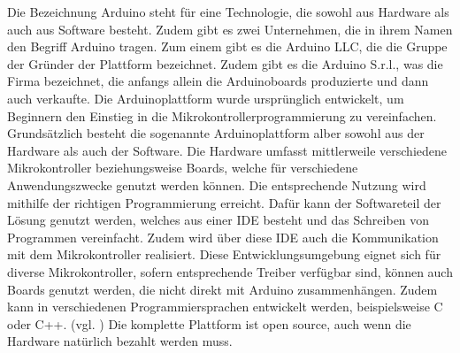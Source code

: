 Die Bezeichnung Arduino steht für eine Technologie, die sowohl aus Hardware als auch aus Software besteht. Zudem gibt es zwei Unternehmen, die in ihrem Namen den Begriff Arduino tragen. Zum einem gibt es die Arduino LLC, die die Gruppe der Gründer der Plattform bezeichnet. Zudem gibt es die Arduino S.r.l., was die Firma bezeichnet, die anfangs allein die Arduinoboards produzierte und dann auch verkaufte. Die Arduinoplattform wurde ursprünglich entwickelt, um Beginnern den Einstieg in die Mikrokontrollerprogrammierung zu vereinfachen. 
Grundsätzlich besteht die sogenannte Arduinoplattform alber sowohl aus der Hardware als auch der Software. Die Hardware umfasst mittlerweile verschiedene Mikrokontroller beziehungsweise Boards, welche für verschiedene Anwendungszwecke genutzt werden können. Die entsprechende Nutzung wird mithilfe der richtigen Programmierung erreicht. Dafür kann der Softwareteil der Lösung genutzt werden, welches aus einer \ac{IDE}  besteht und das Schreiben von Programmen vereinfacht. Zudem wird über diese \ac{IDE} auch die Kommunikation mit dem Mikrokontroller realisiert. Diese Entwicklungsumgebung eignet sich für diverse Mikrokontroller, sofern entsprechende Treiber verfügbar sind, können auch Boards genutzt werden, die nicht direkt mit Arduino zusammenhängen. Zudem kann in verschiedenen Programmiersprachen entwickelt werden, beispielsweise C oder C++. (vgl. \cite{.h,.f,.e,.i,.g,online.})
Die komplette Plattform ist open source, auch wenn die Hardware natürlich bezahlt werden muss. 